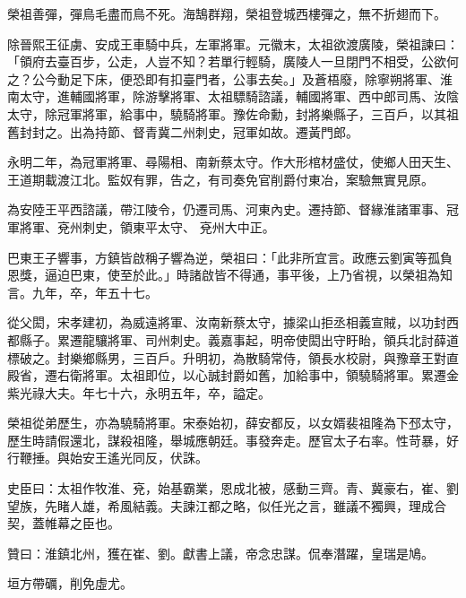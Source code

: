 \begin{pinyinscope}
 榮祖善彈，彈鳥毛盡而鳥不死。海鵠群翔，榮祖登城西樓彈之，無不折翅而下。



 除晉熙王征虜、安成王車騎中兵，左軍將軍。元徽末，太祖欲渡廣陵，榮祖諫曰：「領府去臺百步，公走，人豈不知？若單行輕騎，廣陵人一旦閉門不相受，公欲何之？公今動足下床，便恐即有扣臺門者，公事去矣。」及蒼梧廢，除寧朔將軍、淮南太守，進輔國將軍，除游擊將軍、太祖驃騎諮議，輔國將軍、西中郎司馬、汝陰太守，除冠軍將軍，給事中，驍騎將軍。豫佐命勳，封將樂縣子，三百戶，以其祖舊封封之。出為持節、督青冀二州刺史，冠軍如故。遷黃門郎。



 永明二年，為冠軍將軍、尋陽相、南新蔡太守。作大形棺材盛仗，使鄉人田天生、王道期載渡江北。監奴有罪，告之，有司奏免官削爵付東冶，案驗無實見原。



 為安陸王平西諮議，帶江陵令，仍遷司馬、河東內史。遷持節、督緣淮諸軍事、冠軍將軍、兗州刺史，領東平太守、
 兗州大中正。



 巴東王子響事，方鎮皆啟稱子響為逆，榮祖曰：「此非所宜言。政應云劉寅等孤負恩獎，逼迫巴東，使至於此。」時諸啟皆不得通，事平後，上乃省視，以榮祖為知言。九年，卒，年五十七。



 從父閎，宋孝建初，為威遠將軍、汝南新蔡太守，據梁山拒丞相義宣賊，以功封西都縣子。累遷龍驤將軍、司州刺史。義嘉事起，明帝使閎出守盱眙，領兵北討薛道標破之。封樂鄉縣男，三百戶。升明初，為散騎常侍，領長水校尉，與豫章王對直殿省，遷右衛將軍。太祖即位，以心誠封爵如舊，加給事中，領驍騎將軍。累遷金紫光祿大夫。年七十六，永明五年，卒，謚定。



 榮祖從弟歷生，亦為驍騎將軍。宋泰始初，薛安都反，以女婿裴祖隆為下邳太守，歷生時請假還北，謀殺祖隆，舉城應朝廷。事發奔走。歷官太子右率。性苛暴，好行鞭捶。與始安王遙光同反，伏誅。



 史臣曰：太祖作牧淮、兗，始基霸業，恩成北被，感動三齊。青、冀豪右，崔、劉望族，先睹人雄，希風結義。夫諫江都之略，似任光之言，雖議不獨興，理成合契，蓋帷幕之臣也。



 贊曰：淮鎮北州，獲在崔、劉。獻書上議，帝念忠謀。侃奉潛躍，皇瑞是鳩。



 垣方帶礪，削免虛尤。



\end{pinyinscope}